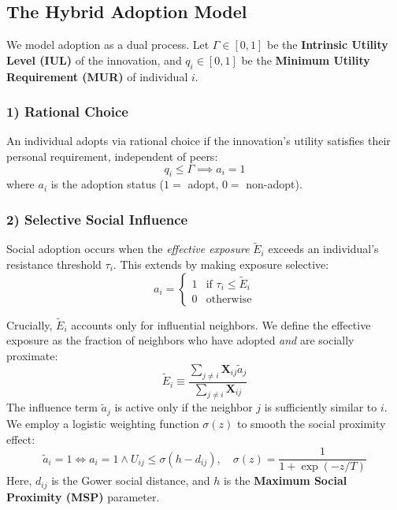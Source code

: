\documentclass[11pt, a4paper]{article}
\begin{document}
\subsection{The Hybrid Adoption Model}
We model adoption as a dual process. Let $\Gamma \in [0,1]$ be the \textbf{Intrinsic Utility Level (IUL)} of the innovation, and $q_i \in [0,1]$ be the \textbf{Minimum Utility Requirement (MUR)} of individual $i$.

\subsubsection{1) Rational Choice}
An individual adopts via rational choice if the innovation's utility satisfies their personal requirement, independent of peers:
\begin{equation}
    q_i \le \Gamma \implies a_i = 1
\end{equation}
where $a_i$ is the adoption status ($1=$ adopt, $0=$ non-adopt).

\subsubsection{2) Selective Social Influence}
Social adoption occurs when the \textit{effective exposure} $\tilde{E}_i$ exceeds an individual's resistance threshold $\tau_i$. This extends \citet{Valente1996} by making exposure selective:
\begin{equation}
    a_i = \begin{cases}
    1 & \text{if } \tau_i \le \tilde{E}_i \\
    0 & \text{otherwise}
    \end{cases}
\end{equation}

Crucially, $\tilde{E}_i$ accounts only for influential neighbors. We define the effective exposure as the fraction of neighbors who have adopted \textit{and} are socially proximate:
\begin{equation}
    \tilde{E}_i \equiv \frac{\sum_{j \neq i} \mathbf{X}_{ij} \tilde{a}_j}{\sum_{j \neq i} \mathbf{X}_{ij}}
\end{equation}
The influence term $\tilde{a}_j$ is active only if the neighbor $j$ is sufficiently similar to $i$. We employ a logistic weighting function $\sigma(z)$ to smooth the social proximity effect:
\begin{equation}
    \tilde{a}_i = 1 \iff a_i = 1 \land U_{ij} \le \sigma(h - d_{ij}), \quad \sigma(z) = \frac{1}{1 + \exp(-z/T)}
\end{equation}
Here, $d_{ij}$ is the Gower social distance, and $h$ is the \textbf{Maximum Social Proximity (MSP)} parameter.
\end{document}
